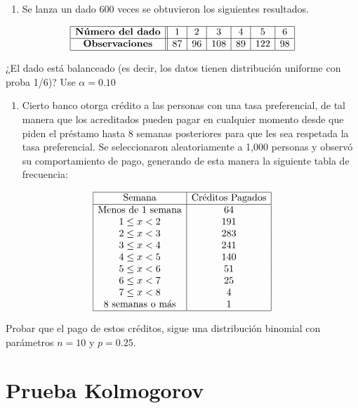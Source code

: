 \documentclass[
  a4paper,
  oneside,
  openany]{book}
\providecommand{\tightlist}{%
  \setlength{\itemsep}{0pt}\setlength{\parskip}{0pt}}
\begin{document}
\begin{enumerate}
\def\labelenumi{\arabic{enumi}.}
\tightlist
\item
  Se lanza un dado 600 veces se obtuvieron los siguientes resultados.
\end{enumerate}

\[
\begin{array}{|c ||c |c |c|c|c|c|}
\hline 
\textbf{Número del dado} & 1& 2& 3&4&5&6 \\
\hline 
\textbf{Observaciones} & 87 &  96 &108&89&122&98 \\
 \hline 
\end{array}
\]

¿El dado está balanceado (es decir, los datos tienen distribución uniforme con proba 1/6)? Use \(\alpha=0.10\)

\begin{enumerate}
\def\labelenumi{\arabic{enumi}.}
\setcounter{enumi}{1}
\tightlist
\item
  Cierto banco otorga crédito a las personas con una tasa preferencial, de tal manera que los acreditados pueden pagar en cualquier momento desde que piden el préstamo hasta 8 semanas posteriores para que les sea respetada la tasa preferencial. Se seleccionaron aleatoriamente a 1,000 personas y observó su comportamiento de pago, generando de esta manera la siguiente tabla de frecuencia:
\end{enumerate}

\[
\begin{array}{|c|c|  }
\hline
\mbox{Semana}& \mbox{Créditos Pagados}\\
\hline
\mbox{Menos de 1  semana} &64\\
1 \leq x < 2& 191\\
2 \leq  x < 3 &283\\
3 \leq  x < 4 &241\\
4 \leq  x < 5 &140\\
5 \leq  x < 6 &51\\
6 \leq  x < 7 &25\\
7 \leq  x < 8 &4\\
\mbox{8 semanas o más} & 1\\
\hline
\end{array}
\]

Probar que el pago de estos créditos, sigue una distribución binomial con parámetros \(n = 10\) y \(p = 0.25\).

\hypertarget{prueba-kolmogorov}{%
\chapter{Prueba Kolmogorov}\label{prueba-kolmogorov}}
\end{document}
